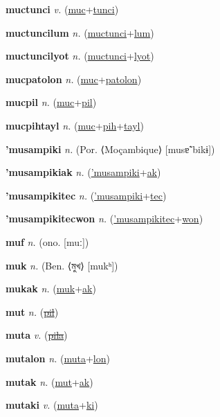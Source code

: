 \textbf{\hypertarget{muctunci}{muctunci}} \textit{v.} (\hyperlink{muc}{muc}+\allowbreak \hyperlink{tunci}{tunci})


\textbf{\hypertarget{muctuncilum}{muctuncilum}} \textit{n.} (\hyperlink{muctunci}{muctunci}+\allowbreak \hyperlink{lum}{lum})


\textbf{\hypertarget{muctuncilyot}{muctuncilyot}} \textit{n.} (\hyperlink{muctunci}{muctunci}+\allowbreak \hyperlink{lyot}{lyot})


\textbf{\hypertarget{mucpatolon}{mucpatolon}} \textit{n.} (\hyperlink{muc}{muc}+\allowbreak \hyperlink{patolon}{patolon})


\textbf{\hypertarget{mucpil}{mucpil}} \textit{n.} (\hyperlink{muc}{muc}+\allowbreak \hyperlink{pil}{pil})


\textbf{\hypertarget{mucpihtayl}{mucpihtayl}} \textit{n.} (\hyperlink{muc}{muc}+\allowbreak \hyperlink{pih}{pih}+\allowbreak \hyperlink{tayl}{tayl})


\textbf{\hypertarget{'musampiki}{'musampiki}} \textit{n.} (Por. ⟨Moçambique⟩ [musɐ̃ˈbikɨ])


\textbf{\hypertarget{'musampikiak}{'musampikiak}} \textit{n.} (\hyperlink{'musampiki}{'musampiki}+\allowbreak \hyperlink{ak}{ak})


\textbf{\hypertarget{'musampikitec}{'musampikitec}} \textit{n.} (\hyperlink{'musampiki}{'musampiki}+\allowbreak \hyperlink{tec}{tec})


\textbf{\hypertarget{'musampikitecwon}{'musampikitecwon}} \textit{n.} (\hyperlink{'musampikitec}{'musampikitec}+\allowbreak \hyperlink{won}{won})


\textbf{\hypertarget{muf}{muf}} \textit{n.} (ono. [muː])


\textbf{\hypertarget{muk}{muk}} \textit{n.} (Ben. ⟨{\bengali{}মুখ}⟩ [mukʰ])


\textbf{\hypertarget{mukak}{mukak}} \textit{n.} (\hyperlink{muk}{muk}+\allowbreak \hyperlink{ak}{ak})


\textbf{\hypertarget{mut}{mut}} \textit{n.} (\hyperlink{pil}{\sout{pil}})


\textbf{\hypertarget{muta}{muta}} \textit{v.} (\hyperlink{pila}{\sout{pila}})


\textbf{\hypertarget{mutalon}{mutalon}} \textit{n.} (\hyperlink{muta}{muta}+\allowbreak \hyperlink{lon}{lon})


\textbf{\hypertarget{mutak}{mutak}} \textit{n.} (\hyperlink{mut}{mut}+\allowbreak \hyperlink{ak}{ak})


\textbf{\hypertarget{mutaki}{mutaki}} \textit{v.} (\hyperlink{muta}{muta}+\allowbreak \hyperlink{ki}{ki})


